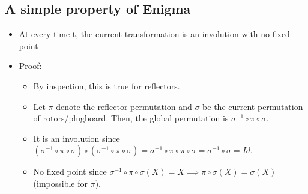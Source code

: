       	\subsection{A simple property of Enigma}
       		\begin{itemize}
       			\item At every time t, the current transformation is an involution with no fixed point
       			\item Proof:
       				\begin{itemize}
       					\item By inspection, this is true for reflectors.
       					\item Let $\pi$ denote the reflector permutation and $\sigma$ be the current permutation of rotors/plugboard.
       					Then, the global permutation is $\sigma^{-1} \circ \pi \circ \sigma$.
       					\item It is an involution since
       					$(\sigma^{-1} \circ \pi \circ \sigma) \circ (\sigma^{-1} \circ \pi \circ \sigma) = \sigma^{-1} \circ \pi \circ \pi \circ \sigma = \sigma^{-1} \circ \sigma = Id$.
       					\item No fixed point since $\sigma^{-1} \circ \pi \circ \sigma(X) = X \implies \pi \circ \sigma(X) = \sigma(X)$\\
       					(impossible for $\pi$).
       				\end{itemize}
       		\end{itemize}
       	
